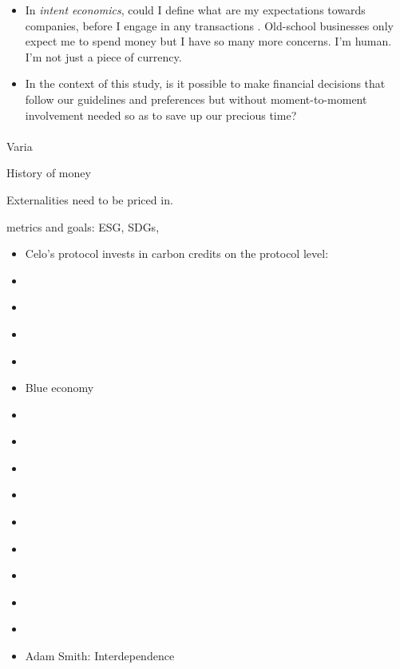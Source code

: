 \documentclass[
  letterpaper,
  DIV=11,
  numbers=noendperiod]{scrartcl}
\makeatletter
\let\oldparagraph\paragraph
\renewcommand{\paragraph}{
    \@ifstar
      \xxxParagraphStar
      \xxxParagraphNoStar
  }
\newcommand{\xxxParagraphStar}[1]{\oldparagraph*{#1}\mbox{}}
\newcommand{\xxxParagraphNoStar}[1]{\oldparagraph{#1}\mbox{}}
\makeatother
\begin{document}
\begin{itemize}
\item
  In \emph{intent economics}, could I define what are my expectations
  towards companies, before I engage in any transactions
  \citet{searlsIntentionEconomyWhen2012}. Old-school businesses only
  expect me to spend money but I have so many more concerns. I'm human.
  I'm not just a piece of currency.
\item
  In the context of this study, is it possible to make financial
  decisions that follow our guidelines and preferences but without
  moment-to-moment involvement needed so as to save up our precious
  time?
\end{itemize}

\paragraph{Varia}\label{varia}

History of money \citet{fergusonAscentMoneyFinancial2009}

Externalities need to be priced in.

metrics and goals: ESG, SDGs,

\begin{itemize}
\item
  Celo's protocol invests in carbon credits on the protocol level:
  \citet{CeloRegenerativeFinance2021}
\item
  \citet{mazzucatoMissionEconomyMoonshot2021}
\item
  \citet{krausmannResourceExtractionOutflows2018}
\item
  \citet{WhatRegenerativeCapitalism2022}
\item
  \citet{support_llBookReviewGreen2021}
\item
  \citet{pauliBlueEconomyMarriage2017} Blue economy
\item
  \citet{standingBlueCommonsRescuing2022}
\item
  \citet{bullerValueWhaleIllusions2022}
\item
  \citet{pauliBlueEconomyMarriage2017}
\item
  \citet{lovinsFinerFutureCreating2018}
\item
  \citet{bardiLimits50Years2022}
\item
  \citet{circlRegenerativeEconomicsReset2021}
\item
  \citet{michaelkramerTEDxHiloMichaelKramer2012}
\item
  \citet{elkingtonGreenSwansComing2020}
\item
  \citet{stockholmresiliencecentretvKateRaworthPresenting2017}
\item
  Adam Smith: Interdependence
\end{itemize}
\end{document}
